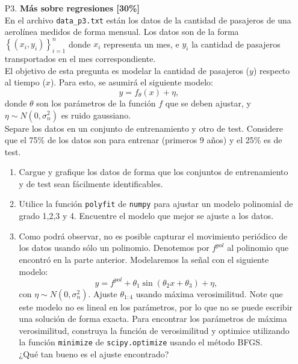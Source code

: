 \documentclass[letterpaper,11pt]{article}
\theoremstyle{plain}
\theoremstyle{definition}
\newcommand{\1}{\mathbbm{1}}
\begin{document}
\begin{enumerate}
\begin{enumerate}
\end{enumerate}


\item [P3.] \textbf{Más sobre regresiones [30\%]}\\

En el archivo \texttt{data\_p3.txt} están los datos de la cantidad de pasajeros de una aerolínea medidos de forma mensual. Los datos son de la forma $\left \{(x_i,y_i)\right \}_{i=1}^{n}$ donde $x_i$ representa un mes, e $y_i$ la cantidad de pasajeros transportados en el mes correspondiente.\\

El objetivo de esta pregunta es modelar la cantidad de pasajeros ($y$) respecto al tiempo ($x$). Para esto, se asumirá el siguiente modelo: 
$$
y = f_{\theta}(x) + \eta,
$$
donde $\theta$ son los parámetros de la función $f$ que se deben ajustar, y $\eta \sim N(0, \sigma_n^2) $ es ruido gaussiano. \\

Separe los datos en un conjunto de entrenamiento y otro de test. Considere que el 75\% de los datos son para entrenar (primeros 9 años) y el 25\% es de test. 
\begin{enumerate}
    \item  Cargue y grafique los datos de forma que  los conjuntos de entrenamiento y de test sean fácilmente identificables.
    \item Utilice la función \texttt{polyfit} de \texttt{numpy} para ajustar un modelo polinomial de grado 1,2,3 y 4. Encuentre el modelo que mejor se ajuste a los datos.
    
    
    
    \item Como podrá observar, no es posible capturar el movimiento periódico de los datos usando sólo un polinomio. Denotemos por $f^{pol}$ al polinomio que encontró en la parte anterior. Modelaremos la señal con el siguiente modelo: 
    $$
    y = f^{pol} + \theta_1 \sin (\theta_2 x + \theta_3) + \eta,
    $$
    con $\eta \sim N(0, \sigma_n^2) $. Ajuste $\theta_{1:4}$ usando máxima verosimilitud. Note que este modelo no es lineal en los parámetros, por lo que no se puede escribir una solución de forma exacta. Para encontrar los parámetros de máxima verosimilitud, construya la función de verosimilitud y optimice utilizando la función \texttt{minimize} de \texttt{scipy.optimize} usando el método BFGS. \\
    ¿Qué tan bueno es el ajuste encontrado?\\
    

\end{enumerate}
\end{enumerate}
\end{document}
